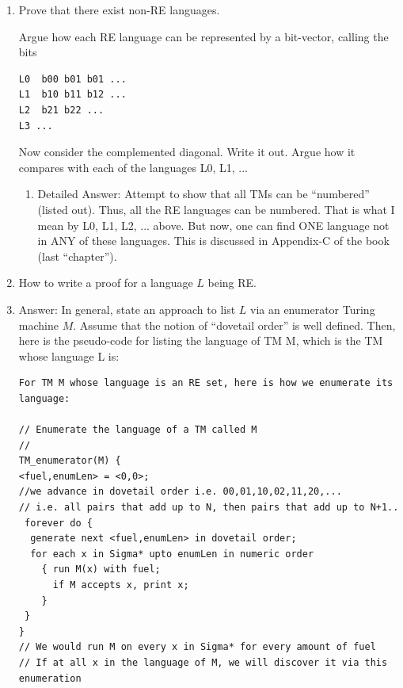 \documentclass[10pt]{article}
\begin{document}
\begin{enumerate}
  \item Prove that there exist non-RE languages.
    \begin{sf}
      Argue how each RE language can be represented by a bit-vector, calling
      the bits

      \begin{footnotesize}
\begin{verbatim}
L0  b00 b01 b01 ...
L1  b10 b11 b12 ...
L2  b21 b22 ...
L3 ...
\end{verbatim}
      \end{footnotesize}
      Now consider the complemented diagonal. Write it out. Argue
      how it compares with each of the languages L0, L1, ...
    \end{sf}
    \begin{enumerate}
    \item[] {\sf Detailed Answer: Attempt to show that all TMs can be
      ``numbered'' (listed out). Thus, all the RE languages can be numbered.
      That is what I mean by L0, L1, L2, ... above.
      But now, one can find ONE language not in ANY of these languages.
      This is discussed in Appendix-C of the book (last ``chapter'').}
    \end{enumerate}


  \item How to write a proof for a language $L$ being RE.
    
  \item[] {\sf Answer: In general, state an approach to list $L$ via
    an enumerator Turing machine $M$.}
  Assume that the notion of ``dovetail order''
  is well defined. Then, here is the pseudo-code for
  listing the language of TM M, which is the TM whose language L is:

\begin{verbatim}
For TM M whose language is an RE set, here is how we enumerate its language:

// Enumerate the language of a TM called M
//
TM_enumerator(M) {
<fuel,enumLen> = <0,0>;
//we advance in dovetail order i.e. 00,01,10,02,11,20,...
// i.e. all pairs that add up to N, then pairs that add up to N+1..
 forever do {
  generate next <fuel,enumLen> in dovetail order;
  for each x in Sigma* upto enumLen in numeric order
    { run M(x) with fuel;
      if M accepts x, print x;
    }
 }
}
// We would run M on every x in Sigma* for every amount of fuel
// If at all x in the language of M, we will discover it via this enumeration
\end{verbatim}



\end{enumerate}
\end{document}
